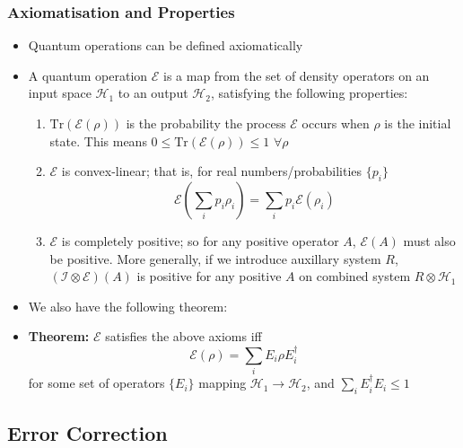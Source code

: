 \documentclass[12pt,a4paper]{article}
\numberwithin{equation}{section}
\begin{document}
	\subsubsection{Axiomatisation and Properties}
	\begin{itemize}
		\item Quantum operations can be defined axiomatically
		\item A quantum operation $\mathcal{E}$ is a map from the set of density operators on an input space $\mathcal{H}_{1}$ to an output $\mathcal{H}_{2}$, satisfying the following properties:
		\begin{enumerate}
			\item $\text{Tr}(\mathcal{E}(\rho))$ is the probability the process $\mathcal{E}$ occurs when $\rho$ is the initial state. This means $0\leq\text{Tr}(\mathcal{E}(\rho))\leq 1$ $\forall \rho$
			\item $\mathcal{E}$ is convex-linear; that is, for real numbers/probabilities $\{p_{i}\}$
			\begin{equation}
				\mathcal{E}\left(\sum_{i}p_{i}\rho_{i}\right)=\sum_{i}p_{i}\mathcal{E}(\rho_{i})
			\end{equation}
			\item $\mathcal{E}$ is completely positive; so for any positive operator $A$, $\mathcal{E}(A)$ must also be positive. More generally, if we introduce auxillary system $R$, $(\mathcal{I}\otimes\mathcal{E})(A)$ is positive for any positive $A$ on combined system $R\otimes\mathcal{H}_{1}$
		\end{enumerate}
		\item We also have the following theorem:
		\item \textbf{Theorem:} $\mathcal{E}$ satisfies the above axioms iff
		\begin{equation} \label{Axiomatisation of operations check}
			\mathcal{E}(\rho)=\sum_{i}E_{i}\rho E_{i}^{\dagger}
		\end{equation}
		for some set of operators $\{E_{i}\}$ mapping $\mathcal{H}_{1}\to\mathcal{H}_{2}$, and $\sum_{i}E_{i}^{\dagger}E_{i}\leq 1$
	\end{itemize}
	\subsection{Error Correction}
\end{document}
